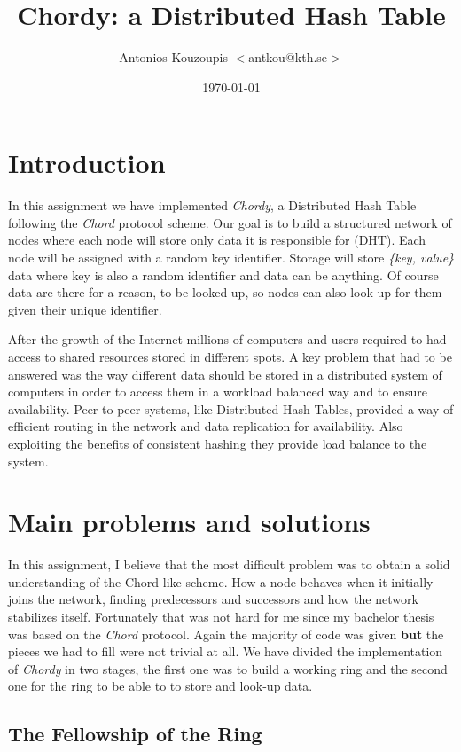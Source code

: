 \documentclass[a4paper, 10pt]{article}
\title{Chordy: a Distributed Hash Table}
\author{Antonios Kouzoupis $<$antkou$@$kth.se$>$}
\date{\today{}}
\begin{document}
\maketitle

\section{Introduction}

In this assignment we have implemented \emph{Chordy}, a Distributed Hash Table
following the \emph{Chord} protocol scheme. Our goal is to build a structured
network of nodes where each node will store only data it is responsible for
(DHT). Each node will be assigned with a random key identifier. Storage will
store \emph{\{key, value\}} data where key is also a random identifier and
data can be anything. Of course data are there for a reason, to be looked up, so
nodes can also look-up for them given their unique identifier.

After the growth of the Internet millions of computers and users required to
had access to shared resources stored in different spots. A key problem that
had to be answered was the way different data should be stored in a distributed system
of computers in order to access them in a workload balanced way and to ensure
availability. Peer-to-peer systems, like Distributed Hash Tables, provided a way
of efficient routing in the network and data replication for availability. Also
exploiting the benefits of consistent hashing they provide load balance to the
system.

\section{Main problems and solutions}

In this assignment, I believe that the most difficult problem was to obtain a
solid understanding of the Chord-like scheme. How a node behaves when it
initially joins the network, finding predecessors and successors and how the
network stabilizes itself. Fortunately that was not hard for me since my
bachelor thesis was based on the \emph{Chord} protocol. Again the majority of
code was given \textbf{but} the pieces we had to fill were not trivial at all.
We have divided the implementation of \emph{Chordy} in two stages, the first one
was to build a working ring and the second one for the ring to be able to to
store and look-up data.

\subsection{The Fellowship of the Ring}
\end{document}

